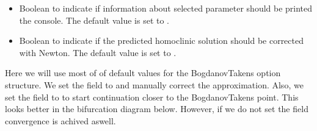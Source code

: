 \documentclass[letterpaper,10pt,english]{jupyterBook}
\begin{document}
\begin{itemize}
\begin{itemize}
\item {} 
\sphinxAtStartPar
orbitalv2,

\item {} 
\sphinxAtStartPar
LP (Lindstedt\sphinxhyphen{}Poincaré with smooth normal form),

\item {} 
\sphinxAtStartPar
LPHypernormalForm,

\item {} 
\sphinxAtStartPar
RegularPerturbation,

\item {} 
\sphinxAtStartPar
RegularPerturbationL2.

\end{itemize}

\sphinxAtStartPar
We refer to {[}\hyperlink{cite.references:id3}{Kuz21}{]} for the interpretations.

\item {} 
\sphinxAtStartPar
{} Boolean to indicate if information about selected parameter should
be printed the console. The default value is set to .

\item {} 
\sphinxAtStartPar
{} Boolean to indicate if the predicted homoclinic solution should be
corrected with Newton. The default value is set to .

\end{itemize}

\sphinxAtStartPar
Here we will use most of of default values for the Bogdanov\sphinxhyphen{}Takens option structure.
We set the field  to  and manually correct the
approximation. Also, we set the field  to  to start continuation
closer to the Bogdanov\sphinxhyphen{}Takens point. This looks better in the bifurcation diagram
below. However, if we do not set the field  convergence is achived aswell.
\end{document}
